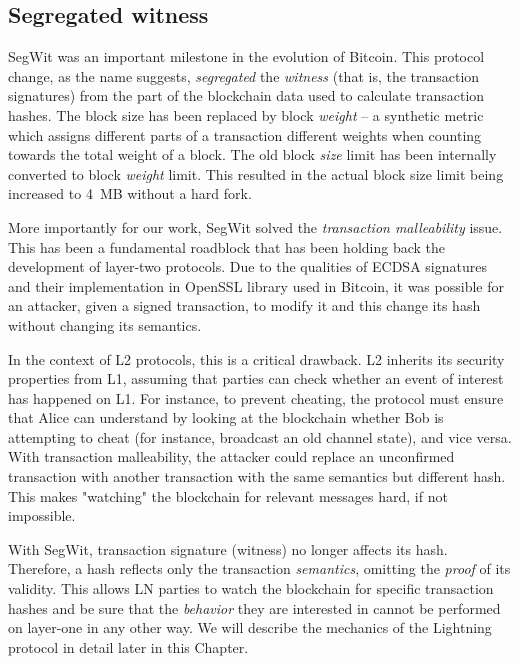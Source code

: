 \subsection{Segregated witness}

SegWit was an important milestone in the evolution of Bitcoin.
This protocol change, as the name suggests, \textit{segregated} the \textit{witness} (that is, the transaction signatures) from the part of the blockchain data used to calculate transaction hashes.
The block size has been replaced by block \textit{weight} -- a synthetic metric which assigns different parts of a transaction different weights when counting towards the total weight of a block.
The old block \textit{size} limit has been internally converted to block \textit{weight} limit.
This resulted in the actual block size limit being increased to 4~MB without a hard fork.

More importantly for our work, SegWit solved the \textit{transaction malleability} issue.
This has been a fundamental roadblock that has been holding back the development of layer-two protocols.
Due to the qualities of ECDSA signatures and their implementation in OpenSSL library used in Bitcoin, it was possible for an attacker, given a signed transaction, to modify it and this change its hash without changing its semantics.

In the context of L2 protocols, this is a critical drawback.
L2 inherits its security properties from L1, assuming that parties can check whether an event of interest has happened on L1.
For instance, to prevent cheating, the protocol must ensure that Alice can understand by looking at the blockchain whether Bob is attempting to cheat (for instance, broadcast an old channel state), and vice versa.
With transaction malleability, the attacker could replace an unconfirmed transaction with another transaction with the same semantics but different hash.
This makes "watching" the blockchain for relevant messages hard, if not impossible.

With SegWit, transaction signature (witness) no longer affects its hash.
Therefore, a hash reflects only the transaction \textit{semantics}, omitting the \textit{proof} of its validity.
This allows LN parties to watch the blockchain for specific transaction hashes and be sure that the \textit{behavior} they are interested in cannot be performed on layer-one in any other way.
We will describe the mechanics of the Lightning protocol in detail later in this Chapter.


